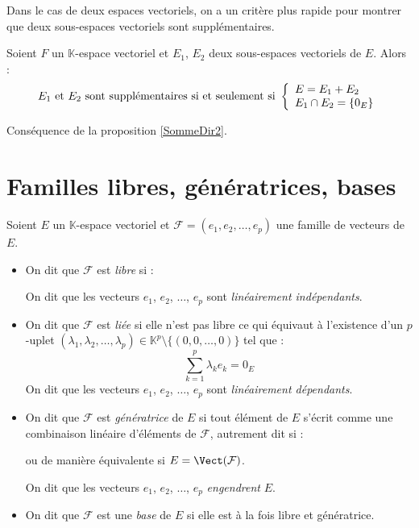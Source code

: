 \documentclass[french,11pt,twoside]{VcCours}
\begin{document}
Dans le cas de deux espaces vectoriels, on a un critère plus rapide pour montrer que deux sous-espaces vectoriels sont supplémentaires.

 \begin{Proposition}{}
 Soient $F$ un $\mathbb{K}$-espace vectoriel et $E_1$, $E_2$ deux sous-espaces vectoriels de $E$. Alors :
 $$ E_1 \hbox{ et } E_2 \hbox{ sont supplémentaires si et seulement si } \left\lbrace\begin{array}{l}
 E=E_1+ E_2 \\
 E_1 \cap E_2 = \lbrace 0_E \rbrace
 \end{array}\right.$$
 \end{Proposition}
 
 \begin{Demonstration}{}
 Conséquence de la proposition \ref{SommeDir2}.
 \end{Demonstration}
 \section{Familles libres, génératrices, bases}
 
 \begin{Definition}{}
Soient $E$ un $\mathbb{K}$-espace vectoriel et $\mathcal{F} = (e_1, e_2, \ldots, e_p)$ une famille de vecteurs de $E$.

\begin{itemize}
\item On dit que $\mathcal{F}$ est \emph{libre} si  :

\vspace{1cm}
%
On dit que les vecteurs $e_1$, $e_2$, $\ldots$, $e_p$ sont \emph{linéairement indépendants}.
\item On dit que $\mathcal{F}$ est \emph{liée} si elle n'est pas libre ce qui équivaut à l'existence d'un $p$-uplet \newline $(\lambda_1, \lambda_2, \ldots, \lambda_p) \in \mathbb{K}^p \setminus \lbrace (0,0, \ldots,0) \rbrace$ tel que :
$$ \sum_{k=1}^p \lambda_k e_k = 0_E$$
On dit que les vecteurs $e_1$, $e_2$, $\ldots$, $e_p$ sont \emph{linéairement dépendants}.
\item On dit que $\mathcal{F}$ est \emph{génératrice} de $E$ si tout élément de $E$ s'écrit comme une combinaison linéaire d'éléments de $\mathcal{F}$, autrement dit si :

\vspace{1cm}

ou de manière équivalente si $E = \Vect(\mathcal{F})$.

On dit que les vecteurs $e_1$, $e_2$, $\ldots$, $e_p$ \emph{engendrent} $E$.
\item On dit que $\mathcal{F}$ est une \emph{base} de $E$ si elle est à la fois libre et génératrice.
\end{itemize}
\end{Definition}
\end{document}
